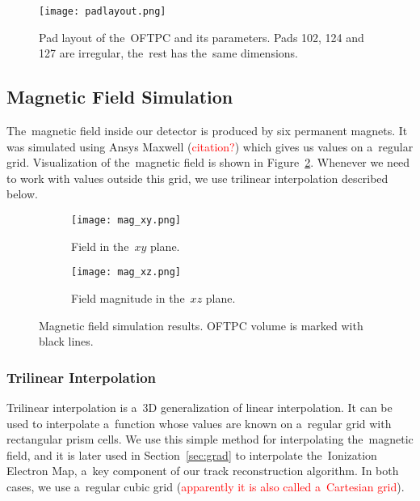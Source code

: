 				\begin{figure}[H]
					\centering
					\texttt{[image: padlayout.png]}
					\caption{Pad layout of the~\ac{OFTPC} and its parameters. Pads 102, 124 and 127 are irregular, the~rest has the~same dimensions.}
					\label{fig:padlayout}
				\end{figure}
		
		\subsection{Magnetic Field Simulation}
		\label{sec:mag}
			The~magnetic field inside our detector is produced by six permanent magnets. It was simulated using Ansys Maxwell (\textcolor{red}{citation?}) which gives us values on a~regular grid. Visualization of the~magnetic field is shown in Figure~\ref{fig:mag}. Whenever we need to work with values outside this grid, we use trilinear interpolation described below.
			
			\begin{figure}
				\centering
				\begin{subfigure}[t]{0.45\textwidth}
					\centering
					\texttt{[image: mag\_xy.png]}
					\caption{Field in the~$xy$ plane.}
				\end{subfigure}
				\hfill
				\begin{subfigure}[t]{0.45\textwidth}
					\centering
					\texttt{[image: mag\_xz.png]}
					\caption{Field magnitude in the~$xz$ plane.}
				\end{subfigure}
				\caption{Magnetic field simulation results. \ac{OFTPC} volume is marked with black lines.}
				\label{fig:mag}
			\end{figure}
		
			\subsubsection{Trilinear Interpolation}
			\label{sec:trilin}
				Trilinear interpolation is a~3D generalization of linear interpolation. It can be used to interpolate a~function whose values are known on a~regular grid with rectangular prism cells. We use this simple method for interpolating the~magnetic field, and it is later used in Section~\ref{sec:grad} to interpolate the~Ionization Electron Map, a~key component of our track reconstruction algorithm. In both cases, we use a~regular cubic grid (\textcolor{red}{apparently it is also called a~Cartesian grid}).
				
